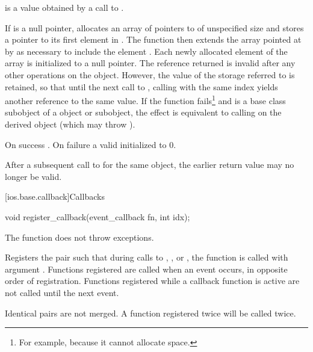 \begin{itemdescr}
\pnum
\expects
{} is a value obtained by a call to .

\pnum
\effects
If  is a null pointer, allocates an array of
pointers to  of unspecified size and stores a pointer to
its
first element in .
The function then extends the array
pointed at by  as necessary to include the element
.
Each newly allocated element of the array is initialized to a null
pointer.
The reference returned is invalid after any other operations on the
object.
However, the value of the storage referred to is retained, so
that until the next call to
,
calling
with the same index yields another reference to the same value.
If the function fails\footnote{For example, because it cannot allocate space.}
and
is a base class subobject of a
object or subobject, the effect is equivalent to calling
on the derived object (which may throw
).

\pnum
\returns
On success
.
On failure a valid
initialized to 0.

\pnum
\remarks
After a subsequent call to
for the same object, the earlier return value may no longer be valid.
\end{itemdescr}

[ios.base.callback]{Callbacks}

%
\begin{itemdecl}
void register_callback(event_callback fn, int idx);
\end{itemdecl}

\begin{itemdescr}
\pnum
\expects
The function
does not throw exceptions.

\pnum
\effects
Registers the pair
such that during calls to
,
,
or
,
the function
is called with argument
.
Functions registered are called when an event occurs, in opposite order of
registration.
Functions registered while a callback function is active are not called until the next event.

\pnum
\remarks
Identical pairs are not merged.
A function registered twice will be called twice.
\end{itemdescr}

